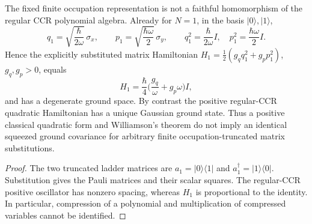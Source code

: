\documentclass[12pt,a4paper]{article}
\begin{document}
\begin{proposition}
\label{p4c:prop:v347-cutoff-ordering}
The fixed finite occupation representation is not a faithful
homomorphism of the regular CCR polynomial algebra.  Already for
\(N=1\), in the basis \(|0\rangle,|1\rangle\),
\[
 q_1=\sqrt{\frac{\hbar}{2\omega}}\,\sigma_x,
 \qquad p_1=\sqrt{\frac{\hbar\omega}{2}}\,\sigma_y,
 \qquad q_1^2=\frac{\hbar}{2\omega}I,\quad
 p_1^2=\frac{\hbar\omega}{2}I.
\]
Hence the explicitly substituted matrix Hamiltonian
\(H_1=\frac12(g_q q_1^2+g_p p_1^2)\), \(g_q,g_p>0\), equals
\[
 \boxed{H_1=\frac\hbar4\Big(\frac{g_q}{\omega}+g_p\omega\Big)I,}
\]
and has a degenerate ground space.  By contrast the positive
regular-CCR quadratic Hamiltonian has a unique Gaussian ground state.
Thus a positive classical quadratic form and Williamson's theorem do
not imply an identical squeezed ground covariance for arbitrary
finite occupation-truncated matrix substitutions.
\end{proposition}
\begin{proof}
The two truncated ladder matrices are \(a_1=|0\rangle\langle1|\)
and \(a_1^\dagger=|1\rangle\langle0|\).  Substitution gives the
Pauli matrices and their scalar squares.  The regular-CCR positive
oscillator has nonzero spacing, whereas \(H_1\) is proportional to
the identity.  In particular, compression of a polynomial and
multiplication of compressed variables cannot be identified.
\end{proof}
\end{document}
